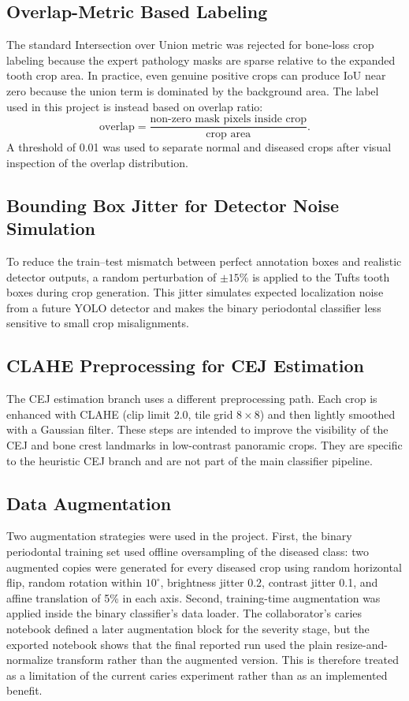 \subsection{Overlap-Metric Based Labeling}
The standard Intersection over Union metric was rejected for bone-loss crop
labeling because the expert pathology masks are sparse relative to the expanded
tooth crop area. In practice, even genuine positive crops can produce IoU near
zero because the union term is dominated by the background area. The label used
in this project is instead based on overlap ratio:
\[
\mathrm{overlap} =
\frac{\text{non-zero mask pixels inside crop}}{\text{crop area}}.
\]
A threshold of 0.01 was used to separate normal and diseased crops after visual
inspection of the overlap distribution.

\subsection{Bounding Box Jitter for Detector Noise Simulation}
To reduce the train--test mismatch between perfect annotation boxes and
realistic detector outputs, a random perturbation of \(\pm 15\%\) is applied to
the Tufts tooth boxes during crop generation. This jitter simulates expected
localization noise from a future YOLO detector and makes the binary
periodontal classifier less sensitive to small crop misalignments.

\subsection{CLAHE Preprocessing for CEJ Estimation}
The CEJ estimation branch uses a different preprocessing path. Each crop is
enhanced with CLAHE (clip limit 2.0, tile grid \(8 \times 8\)) and then lightly
smoothed with a Gaussian filter. These steps are intended to improve the
visibility of the CEJ and bone crest landmarks in low-contrast panoramic crops.
They are specific to the heuristic CEJ branch and are not part of the main
classifier pipeline.

\subsection{Data Augmentation}
Two augmentation strategies were used in the project. First, the binary
periodontal training set used offline oversampling of the diseased class:
two augmented copies were generated for every diseased crop using random
horizontal flip, random rotation within \(10^\circ\), brightness jitter 0.2,
contrast jitter 0.1, and affine translation of 5\% in each axis. Second,
training-time augmentation was applied inside the binary classifier's data
loader. The collaborator's caries notebook defined a later augmentation block
for the severity stage, but the exported notebook shows that the final reported
run used the plain resize-and-normalize transform rather than the augmented
version. This is therefore treated as a limitation of the current caries
experiment rather than as an implemented benefit.

